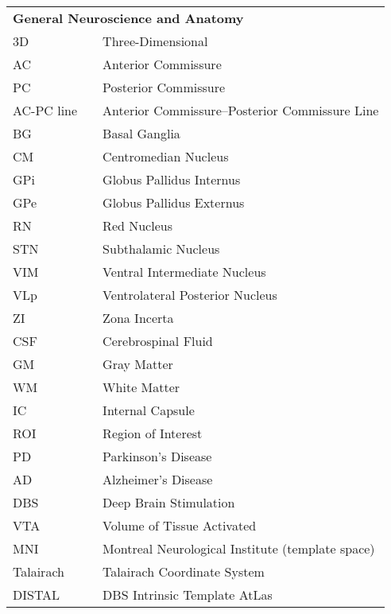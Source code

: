 \documentclass[hidelinks,12pt,oneside]{report}
\numberwithin{figure}{chapter}
\newenvironment{preliminary}%
{\pagestyle{plain}\pagenumbering{roman}}%
{\pagenumbering{arabic}}
\begin{document}
\begin{preliminary}
\begin{longtable}{lll}
\multicolumn{3}{l}{\textbf{General Neuroscience and Anatomy}} \\
3D & & Three-Dimensional \\
AC & & Anterior Commissure \\
PC & & Posterior Commissure \\
AC-PC line & & Anterior Commissure–Posterior Commissure Line \\
BG & & Basal Ganglia \\
CM & & Centromedian Nucleus \\
GPi & & Globus Pallidus Internus \\
GPe & & Globus Pallidus Externus \\
RN & & Red Nucleus \\
STN & & Subthalamic Nucleus \\
VIM & & Ventral Intermediate Nucleus \\
VLp & & Ventrolateral Posterior Nucleus \\
ZI & & Zona Incerta \\
CSF & & Cerebrospinal Fluid \\
GM & & Gray Matter \\
WM & & White Matter \\
IC & & Internal Capsule \\
ROI & & Region of Interest \\
PD & & Parkinson’s Disease \\
AD & & Alzheimer's Disease \\
DBS & & Deep Brain Stimulation \\
VTA & & Volume of Tissue Activated \\
MNI & & Montreal Neurological Institute (template space) \\
Talairach & & Talairach Coordinate System \\
DISTAL & & DBS Intrinsic Template AtLas \\


\end{longtable}
\end{preliminary}
\end{document}

